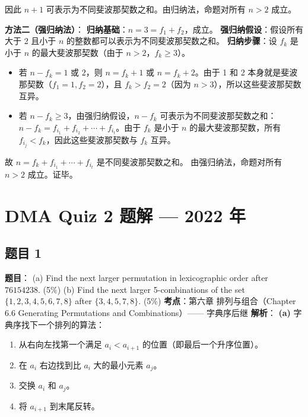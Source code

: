\documentclass[10pt,a4paper,openany]{ctexbook}
\theoremstyle{definition}
\theoremstyle{remark}
\begin{document}
因此 $n+1$ 可表示为不同斐波那契数之和。由归纳法，命题对所有 $n > 2$ 成立。
\vspace{-2pt}

\textbf{方法二（强归纳法）}：
\textbf{归纳基础}：$n = 3 = f_1 + f_2$，成立。
\textbf{强归纳假设}：假设所有大于 2 且小于 $n$ 的整数都可以表示为不同斐波那契数之和。
\textbf{归纳步骤}：设 $f_k$ 是小于 $n$ 的最大斐波那契数（由于 $n > 2$，$f_k \ge 3$）。
\begin{itemize}
\item 若 $n - f_k = 1$ 或 $2$，则 $n = f_k + 1$ 或 $n = f_k + 2$。由于 1 和 2 本身就是斐波那契数（$f_1 = 1, f_2 = 2$），且 $f_k > f_2 = 2$（因为 $n > 3$），所以这些斐波那契数互异。

\item 若 $n - f_k \ge 3$，由强归纳假设，$n - f_k$ 可表示为不同斐波那契数之和：$n - f_k = f_{i_1} + f_{i_2} + \cdots + f_{i_t}$。由于 $f_k$ 是小于 $n$ 的最大斐波那契数，所有 $f_{i_j} < f_k$，因此这些斐波那契数与 $f_k$ 互异。

\end{itemize}

故 $n = f_k + f_{i_1} + \cdots + f_{i_t}$ 是不同斐波那契数之和。
由强归纳法，命题对所有 $n > 2$ 成立。证毕。


\section{DMA Quiz 2 题解 — 2022 年}

\subsection{题目 1}

\textbf{题目}：
(a) Find the next larger permutation in lexicographic order after $76154238$. (5\%)
(b) Find the next larger 5-combinations of the set $\{1,2,3,4,5,6,7,8\}$ after $\{3,4,5,7,8\}$. (5\%)
\textbf{考点}：第六章 排列与组合（Chapter 6.6 Generating Permutations and Combinations）—— 字典序后继
\textbf{解析}：
\textbf{(a)} 字典序找下一个排列的算法：
\begin{enumerate}
\item 从右向左找第一个满足 $a_i < a_{i+1}$ 的位置（即最后一个升序位置）。
\item 在 $a_i$ 右边找到比 $a_i$ 大的最小元素 $a_j$。
\item 交换 $a_i$ 和 $a_j$。
\item 将 $a_{i+1}$ 到末尾反转。

\end{enumerate}
\end{document}
